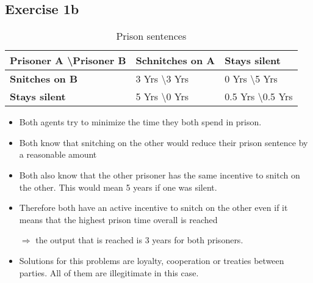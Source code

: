 \documentclass[12pt,a4paper]{scrartcl}
\begin{document}
\subsection*{Exercise 1b}
\begin{table}[h]
	\centering
	\label{my-label}
	\begin{tabular}{|l|l|l|}
		\hline
		\textbf{Prisoner A \textbackslash Prisoner B} & \textbf{Schnitches on A}   & \textbf{Stays silent}          \\ \hline
		\textbf{Snitches on B}                        & 3 Yrs \textbackslash 3 Yrs & 0 Yrs \textbackslash 5 Yrs     \\ \hline
		\textbf{Stays silent}                         & 5 Yrs \textbackslash 0 Yrs & 0.5 Yrs \textbackslash 0.5 Yrs \\ \hline
	\end{tabular}
	\caption{Prison sentences}
\end{table}
	\begin{itemize}
		\item Both agents try to minimize the time they both spend in prison.
		\item Both know that snitching on the other would reduce their prison sentence by a reasonable amount
		\item Both also know that the other prisoner has the same incentive to snitch on the other. This would mean 5 years if one was silent.
		\item Therefore both have an active incentive to snitch on the other even if it means that the highest prison time overall is reached
		\item[$\Rightarrow$] the output that is reached is 3 years for both prisoners.
		\item Solutions for this problems are loyalty, cooperation or treaties between parties. All of them are illegitimate in this case.
	\end{itemize}
\end{document}
